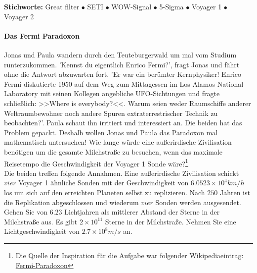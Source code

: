 \documentclass[a4paper, 9pt]{scrartcl}\usepackage[]{graphicx}\usepackage[]{xcolor}
\begin{document}
{\tiny\textbf{Stichworte:} Great filter $\bullet$ SETI $\bullet$ WOW-Signal $\bullet$ 5-Sigma $\bullet$ Voyager 1 $\bullet$ Voyager 2}




\paragraph{Das Fermi Paradoxon}



Jonas und Paula wandern durch den Teuteburgerwald um mal vom Studium runterzukommen. 'Kennst du eigentlich Enrico Fermi?', fragt Jonas und fährt ohne die Antwort abzuwarten fort, 'Er war ein berümter Kernphysiker! Enrico Fermi diskutierte 1950 auf dem Weg zum Mittagessen im Los Alamos National Laboratory mit seinen Kollegen angebliche UFO-Sichtungen und fragte schließlich: >>Where is everybody?<<. Warum seien weder Raumschiffe anderer Weltraumbewohner noch andere Spuren extraterrestrischer Technik zu beobachten?'. Paula schaut ihn irritiert und interessiert an. Die beiden hat das Problem gepackt. Deshalb wollen Jonas und Paula das Paradoxon mal mathematisch untersuchen! Wie lange würde eine außerirdische Zivilisation benötigen um die gesamte Milchstraße zu besuchen, wenn das maximale Reisetempo die Geschwindigkeit der Voyager 1 Sonde wäre?\footnote{Die Quelle der Inspiration für die Aufgabe war folgender Wikipediaeintrag: \href{https://de.wikipedia.org/wiki/Fermi-Paradoxon}{Fermi-Paradoxon}}\\[-1ex]

Die beiden treffen folgende Annahmen. Eine außerirdische Zivilisation schickt $vier$ Voyager 1 ähnliche Sonden mit der Geschwindigkeit von $\ensuremath{6.0523\times 10^{4}}km/h$ los um sich auf den erreichten Planeten selbst zu replizieren. Nach $250$ Jahren ist die Replikation abgeschlossen und wiederum $vier$ Sonden werden ausgesendet. Gehen Sie von $6.23$ Lichtjahren als mittlerer Abstand der Sterne in der Milchstraße aus. Es gibt $\ensuremath{2\times 10^{11}}$ Sterne in der Milchstraße. Nehmen Sie eine Lichtgeschwindigkeit von $\ensuremath{2.7\times 10^{8}}m/s$ an.
\end{document}
